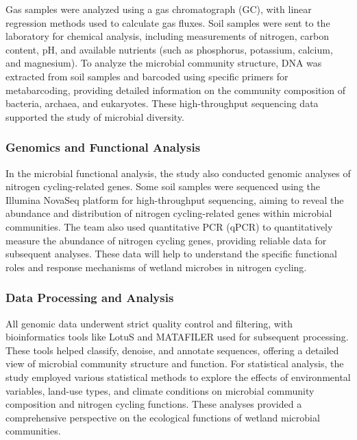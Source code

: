 \documentclass[
]{article}
\begin{document}
Gas samples were analyzed using a gas chromatograph (GC), with linear
regression methods used to calculate gas fluxes. Soil samples were sent
to the laboratory for chemical analysis, including measurements of
nitrogen, carbon content, pH, and available nutrients (such as
phosphorus, potassium, calcium, and magnesium). To analyze the microbial
community structure, DNA was extracted from soil samples and barcoded
using specific primers for metabarcoding, providing detailed information
on the community composition of bacteria, archaea, and eukaryotes. These
high-throughput sequencing data supported the study of microbial
diversity.

\hypertarget{genomics-and-functional-analysis}{%
\subsubsection{\texorpdfstring{\textbf{Genomics and Functional
Analysis}}{Genomics and Functional Analysis}}\label{genomics-and-functional-analysis}}

In the microbial functional analysis, the study also conducted genomic
analyses of nitrogen cycling-related genes. Some soil samples were
sequenced using the Illumina NovaSeq platform for high-throughput
sequencing, aiming to reveal the abundance and distribution of nitrogen
cycling-related genes within microbial communities. The team also used
quantitative PCR (qPCR) to quantitatively measure the abundance of
nitrogen cycling genes, providing reliable data for subsequent analyses.
These data will help to understand the specific functional roles and
response mechanisms of wetland microbes in nitrogen cycling.

\hypertarget{data-processing-and-analysis}{%
\subsubsection{\texorpdfstring{\textbf{Data Processing and
Analysis}}{Data Processing and Analysis}}\label{data-processing-and-analysis}}

All genomic data underwent strict quality control and filtering, with
bioinformatics tools like LotuS and MATAFILER used for subsequent
processing. These tools helped classify, denoise, and annotate
sequences, offering a detailed view of microbial community structure and
function. For statistical analysis, the study employed various
statistical methods to explore the effects of environmental variables,
land-use types, and climate conditions on microbial community
composition and nitrogen cycling functions. These analyses provided a
comprehensive perspective on the ecological functions of wetland
microbial communities.
\end{document}
